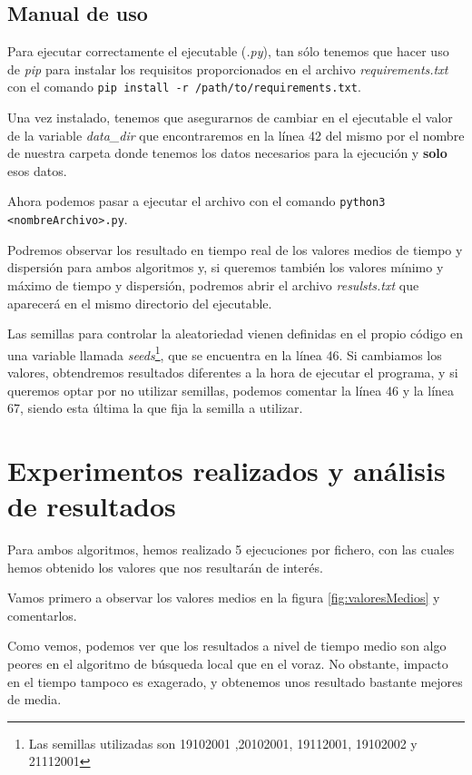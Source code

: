 \subsection{Manual de uso}

Para ejecutar correctamente el ejecutable (\textit{.py}), tan sólo tenemos que hacer uso de \textit{pip} para instalar los requisitos proporcionados en el archivo \textit{requirements.txt}
con el comando \texttt{pip install -r /path/to/requirements.txt}.

Una vez instalado, tenemos que asegurarnos de cambiar en el ejecutable el valor de la variable \textit{data\_dir} que encontraremos en la línea 42 del mismo por el nombre de nuestra carpeta donde tenemos los datos necesarios para la ejecución y \textbf{solo} esos datos.

Ahora podemos pasar a ejecutar el archivo con el comando \texttt{python3 <nombreArchivo>.py}.

Podremos observar los resultado en tiempo real de los valores medios de tiempo y dispersión para ambos algoritmos y, si queremos también los valores mínimo y máximo de tiempo y dispersión, podremos abrir el archivo \textit{resulsts.txt} que aparecerá en el mismo directorio del ejecutable.

Las semillas para controlar la aleatoriedad vienen definidas en el propio código en una variable llamada \textit{seeds}\footnote{Las semillas utilizadas son 19102001 ,20102001, 19112001, 19102002 y 21112001}, que se encuentra en la línea 46. Si cambiamos los valores, obtendremos resultados diferentes a la hora de ejecutar el programa, y si queremos optar por no utilizar semillas, podemos comentar la línea 46 y la línea 67, siendo esta última la que fija la semilla a utilizar.
\newpage

\section{Experimentos realizados y análisis de resultados}

Para ambos algoritmos, hemos realizado 5 ejecuciones por fichero, con las cuales hemos obtenido los valores que nos resultarán de interés.

Vamos primero a observar los valores medios en la figura \ref{fig:valoresMedios} y comentarlos.

Como vemos, podemos ver que los resultados a nivel de tiempo medio son algo peores en el algoritmo de búsqueda local que en el voraz.
No obstante, impacto en el tiempo tampoco es exagerado, y obtenemos unos resultado bastante mejores de media.

